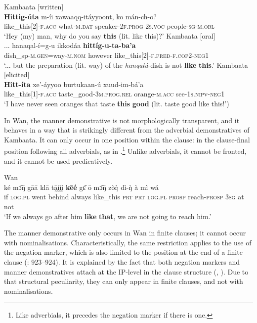 \documentclass[output=paper,colorlinks,citecolor=brown]{langscibook}
\begin{document}
\ea\label{ex:nikitina:12} 
\ea\label{ex:nikitina:12a} {Kambaata [written]}\\
\gll \textbf{Hittig-úta} m-íi xawaaqq-itáyyoont, ko mán-ch-o?\\
     like\_this[2]\textsc{{}-f.acc} what-\textsc{m.dat} speaker-\textsc{2f.prog} \textsc{2s.voc} people-\textsc{sg}{}-\textsc{m.obl}\\
\glt ‘Hey (my) man, why do you say \textbf{this} (lit. like this)?’ 
\ex\label{ex:nikitina:12b} {Kambaata [oral]}\\
\gll ... hanaqal-í=g-u ikkodáa \textbf{hittíg-u-ta-ba’a}\\
     {} dish\_sp-\textsc{m.gen}=way-\textsc{m.nom} however like\_this[2]-\textsc{f.pred}{}-\textsc{f.cop2}{}-\textsc{neg1}\\
\glt ‘... but the preparation (lit. way) of the \textit{hanqalú}{}-dish is not \textbf{like} \textbf{this}.’ 
\ex\label{ex:nikitina:12c} {Kambaata [elicited]}\\
\gll \textbf{Hitt-íta} xe’-áyyoo burtukaan-ú xuud-im-bá’a\\
     like\_this[1]\textsc{{}-f.acc} taste\_good-3\textsc{m.prog.rel} orange-\textsc{m.acc} see-\textsc{1s.nipv}{}-\textsc{neg1}\\
\glt ‘I have never seen oranges that taste \textbf{this} \textbf{good} (lit. taste good like this!’) 
\z
\z 

In Wan, the manner demonstrative is not morphologically transparent, and it behaves in a way that is strikingly different from the adverbial demonstratives of Kambaata. It can only occur in one position within the clause: in the clause-final position following all adverbials, as in .\footnote{Like adverbials, it precedes the negation marker if there is one.} Unlike adverbials, it cannot be fronted, and it cannot be used predicatively.

\ea\label{ex:nikitina:13} {Wan}\\
\gll ké m\={ɔ}\={ŋ} gāā klā tā̰ḭ́ḭ́ḭ́ \textbf{kēé} g\={ɛ} ō m\={ɔ}\={ŋ} zò\`{ŋ} dì-\`{ŋ} à mì wá \\
     if \textsc{log.pl} went behind always like\_this \textsc{prt} \textsc{prt} \textsc{log.pl} \textsc{prosp} reach-\textsc{prosp} \textsc{3sg} at not\\
\glt ‘If we always go after him \textbf{like} \textbf{that}, we are not going to reach him.’
\z

The manner demonstrative only occurs in Wan in finite clauses; it cannot occur with nominalisations. Characteristically, the same restriction applies to the use of the negation marker, which is also limited to the position at the end of a finite clause (\citealt{Nikitina2009}: 923–924). It is explained by the fact that both negation markers and manner demonstratives attach at the IP-level in the clause structure (\citealt{Nikitina2008}, \citeyear{Nikitina2019VP}). Due to that structural peculiarity, they can only appear in finite clauses, and not with nominalisations.
\end{document}
